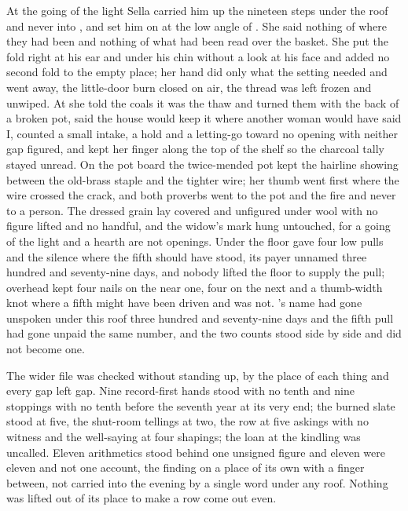 At the going of the light Sella carried him up the nineteen steps under the roof and never into , and set him on  at the low angle of . She said nothing of where they had been and nothing of what had been read over the basket. She put the fold right at his ear and under his chin without a look at his face and added no second fold to the empty place; her hand did only what the setting needed and went away, the little-door burn closed on air, the thread was left frozen and unwiped. At  she told the coals it was the thaw and turned them with the back of a broken pot, said the house would keep it where another woman would have said I, counted a small intake, a hold and a letting-go toward no opening with neither gap figured, and kept her finger along the top of the shelf so the charcoal tally stayed unread. On the pot board the twice-mended pot kept the hairline showing between the old-brass staple and the tighter wire; her thumb went first where the wire crossed the crack, and both proverbs went to the pot and the fire and never to a person. The dressed grain lay covered and unfigured under wool with no figure lifted and no handful, and the widow's mark hung untouched, for a going of the light and a hearth are not openings. Under the floor  gave four low pulls and the silence where the fifth should have stood, its payer unnamed three hundred and seventy-nine days, and nobody lifted the floor to supply the pull; overhead  kept four nails on the near one, four on the next and a thumb-width knot where a fifth might have been driven and was not. 's name had gone unspoken under this roof three hundred and seventy-nine days and the fifth pull had gone unpaid the same number, and the two counts stood side by side and did not become one.

The wider file was checked without standing up, by the place of each thing and every gap left gap. Nine record-first hands stood with no tenth and nine stoppings with no tenth before the seventh year at its very end; the burned slate stood at five, the shut-room tellings at two, the row at five askings with no witness and the well-saying at four shapings; the loan at the kindling was uncalled. Eleven arithmetics stood behind one unsigned figure and eleven were eleven and not one account, the finding on a place of its own with a finger between, not carried into the evening by a single word under any roof. Nothing was lifted out of its place to make a row come out even.

